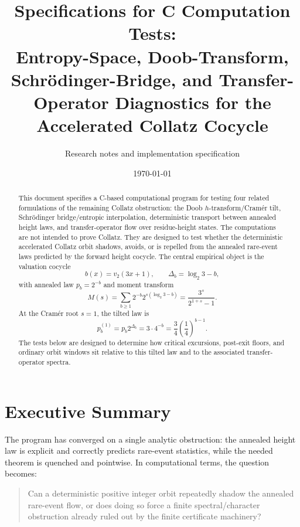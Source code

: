 \documentclass[11pt]{article}
\title{Specifications for C Computation Tests:\\
Entropy-Space, Doob-Transform, Schr\"odinger-Bridge, and Transfer-Operator Diagnostics for the Accelerated Collatz Cocycle}
\author{Research notes and implementation specification}
\date{\today}
\newcommand{\ord}{v_2}
\begin{document}
\maketitle

\begin{abstract}
This document specifies a C-based computational program for testing four related formulations of the remaining Collatz obstruction: the Doob $h$-transform/Cram\'er tilt, Schr\"odinger bridge/entropic interpolation, deterministic transport between annealed height laws, and transfer-operator flow over residue-height states. The computations are not intended to prove Collatz. They are designed to test whether the deterministic accelerated Collatz orbit shadows, avoids, or is repelled from the annealed rare-event laws predicted by the forward height cocycle. The central empirical object is the valuation cocycle
\[
  b(x)=\ord(3x+1),\qquad \Delta_b=\log_2 3-b,
\]
with annealed law $p_b=2^{-b}$ and moment transform
\[
  M(s)=\sum_{b\ge1}2^{-b}2^{s(\log_2 3-b)}=\frac{3^s}{2^{1+s}-1}.
\]
At the Cram\'er root $s=1$, the tilted law is
\[
  p_b^{(1)}=p_b2^{\Delta_b}=3\cdot4^{-b}=\frac34\left(\frac14\right)^{b-1}.
\]
The tests below are designed to determine how critical excursions, post-exit floors, and ordinary orbit windows sit relative to this tilted law and to the associated transfer-operator spectra.
\end{abstract}

\tableofcontents
\newpage

\section{Executive Summary}

The program has converged on a single analytic obstruction: the annealed height law is explicit and correctly predicts rare-event statistics, while the needed theorem is quenched and pointwise. In computational terms, the question becomes:
\begin{quote}
Can a deterministic positive integer orbit repeatedly shadow the annealed rare-event flow, or does doing so force a finite spectral/character obstruction already ruled out by the finite certificate machinery?
\end{quote}
\end{document}
